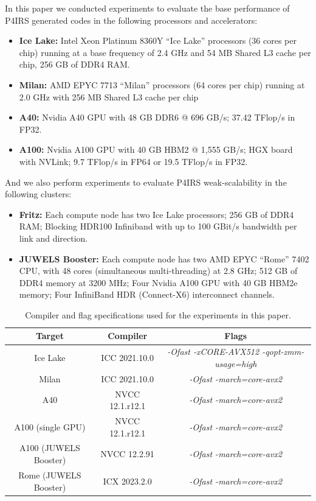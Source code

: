 \documentclass[Afour,sageh,times]{sagej}
\newcommand{\RMchange}[1]{{\color{blue} #1}}
\begin{document}
In this paper we conducted experiments to evaluate the base performance of P4IRS generated codes in the following processors and accelerators:

\begin{itemize}
  \item \textbf{Ice Lake:} Intel Xeon Platinum 8360Y “Ice Lake” processors (36 cores per chip) running at a base frequency of 2.4 GHz and 54 MB Shared L3 cache per chip, 256 GB of DDR4 RAM.
  \item \textbf{Milan:} AMD EPYC 7713 “Milan” processors (64 cores per chip) running at 2.0 GHz with 256 MB Shared L3 cache per chip
  \item \textbf{A40:} Nvidia A40 GPU with 48 GB DDR6 @ 696 GB/s; 37.42 TFlop/s in FP32.
  \item \textbf{A100:} Nvidia A100 GPU with 40 GB HBM2 @ 1,555 GB/s; HGX board with NVLink; 9.7 TFlop/s in FP64 or 19.5 TFlop/s in FP32.
\end{itemize}

And we also perform experiments to evaluate P4IRS weak-scalability in the following clusters:

\begin{itemize}
  \item \textbf{Fritz:} Each compute node has two Ice Lake processors; 256 GB of DDR4 RAM; Blocking HDR100 Infiniband with up to 100 GBit/s bandwidth per link and direction.
  \item \textbf{JUWELS Booster:} Each compute node has two AMD EPYC ``Rome'' 7402 CPU, with 48 cores (simultaneous multi-threading) at 2.8 GHz; 512 GB of DDR4 memory at 3200 MHz; Four Nvidia A100 GPU with 40 GB HBM2e memory; Four InfiniBand HDR (Connect-X6) interconnect channels.
\end{itemize}

\begin{table}[htb]
    \centering
    \begin{tabular}{c|c|c}
        Target & Compiler & Flags \\
        \hline
        Ice Lake & ICC 2021.10.0 & \emph{-Ofast -xCORE-AVX512 -qopt-zmm-usage=high} \\
        Milan & ICC 2021.10.0 & \emph{-Ofast -march=core-avx2} \\
        A40 & NVCC 12.1.r12.1 & \emph{-Ofast -march=core-avx2} \\
        A100 (single GPU) & NVCC 12.1.r12.1 & \emph{-Ofast -march=core-avx2} \\
        A100 (JUWELS Booster) & NVCC 12.2.91 & \emph{-Ofast -march=core-avx2} \\
        Rome (JUWELS Booster) & ICX 2023.2.0 & \emph{-Ofast -march=core-avx2} \\
    \end{tabular}
    \caption{\RMchange{Compiler and flag specifications used for the experiments in this paper.}}
    \label{tab:compilers}
\end{table}
\end{document}

